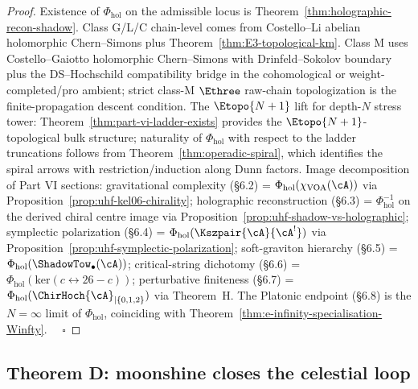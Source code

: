 \begin{proof}
Existence of $\Phi_{\mathrm{hol}}$ on the admissible locus is
Theorem~\ref{thm:holographic-recon-shadow}. Class G/L/C chain-level
comes from Costello--Li abelian holomorphic Chern--Simons plus
Theorem~\ref{thm:E3-topological-km}. Class M uses Costello--Gaiotto
holomorphic Chern--Simons with Drinfeld--Sokolov boundary plus the
DS--Hochschild compatibility bridge in the cohomological or
weight-completed/pro ambient; strict class-M $\Ethree$ raw-chain
topologization is the finite-propagation descent condition. The
$\Etopo{N+1}$ lift for
depth-$N$ stress
tower: Theorem~\ref{thm:part-vi-ladder-exists} provides the
$\Etopo{N+1}$-topological bulk structure; naturality of
$\Phi_{\mathrm{hol}}$ with respect to the ladder truncations follows
from Theorem~\ref{thm:operadic-spiral}, which identifies the spiral
arrows with restriction/induction along Dunn factors. Image decomposition
of Part VI sections: gravitational complexity
(\S6.2) = $\Phi_{\mathrm{hol}}(\chi_{\mathrm{VOA}}(\cA))$ via
Proposition~\ref{prop:uhf-kel06-chirality}; holographic reconstruction
(\S6.3) = $\Phi_{\mathrm{hol}}^{-1}$ on the derived chiral centre image
via Proposition~\ref{prop:uhf-shadow-vs-holographic}; symplectic
polarization (\S6.4) = $\Phi_{\mathrm{hol}}(\Kszpair{\cA}{\cA^!})$ via
Proposition~\ref{prop:uhf-symplectic-polarization}; soft-graviton
hierarchy (\S6.5) = $\Phi_{\mathrm{hol}}(\ShadowTow_\bullet(\cA))$; critical-string
dichotomy (\S6.6) = $\Phi_{\mathrm{hol}}(\mathrm{ker}(c \leftrightarrow 26-c))$;
perturbative finiteness (\S6.7) = $\Phi_{\mathrm{hol}}(\ChirHoch{\cA}_{|\{0,1,2\}})$
via Theorem~H. The Platonic endpoint (\S6.8) is the $N = \infty$ limit of
$\Phi_{\mathrm{hol}}$, coinciding with
Theorem~\ref{thm:e-infinity-specialisation-Winfty}. $\quad\square$
\end{proof}

\subsection{Theorem D: moonshine closes the celestial loop}
\label{sec:part-vi-theorem-D}

